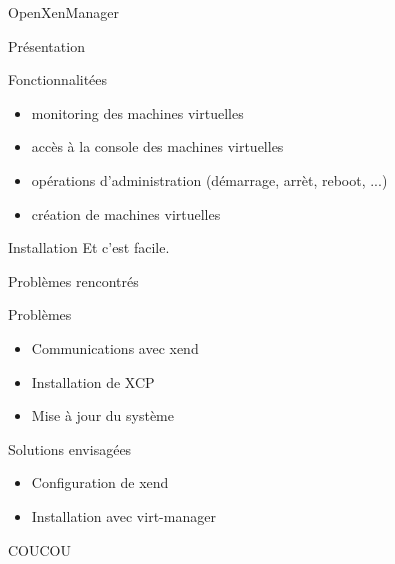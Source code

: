
\begin{frame}
  \begin{center}
   \huge{OpenXenManager}
  \end{center}
\end{frame}

\begin{frame}{Présentation}
\begin{block}{Fonctionnalitées}
\begin{itemize}
\item  monitoring des machines virtuelles
\pause
\item accès à la console des machines virtuelles
\pause
\item opérations d'administration (démarrage, arrèt, reboot, ...)
\pause
\item création de machines virtuelles
\end{itemize}
\end{block}
\end{frame}
\begin{frame}{Installation}
  Et c'est facile.
\end{frame}

\begin{frame}{Problèmes rencontrés}
 \begin{alertblock}{Problèmes}
   \begin{itemize}
     \item Communications avec xend
       \pause
     \item Installation de XCP
       \pause
     \item Mise à jour du système
   \end{itemize}
 \end{alertblock}
\pause
 \begin{exampleblock}{Solutions envisagées}
   \begin{itemize}
     \item Configuration de xend
       \pause
     \item Installation avec virt-manager
   \end{itemize}
 \end{exampleblock}
\end{frame}

\begin{frame}
COUCOU
\end{frame}
